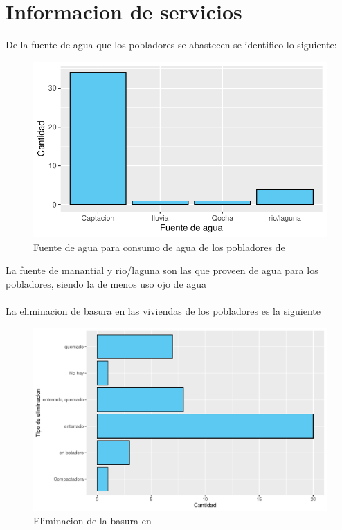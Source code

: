 \documentclass[12pt]{article}\usepackage[]{graphicx}\usepackage[]{xcolor}
\makeatletter
\def\maxwidth{ %
  \ifdim\Gin@nat@width>\linewidth
    \linewidth
  \else
    \Gin@nat@width
  \fi
}
\newenvironment{knitrout}{}{} %
\makeatother
\begin{document}
	\section{Informacion de servicios}
	De la fuente de agua que los pobladores se abastecen se identifico lo siguiente:
	\begin{figure}[H]
	\centering
\begin{knitrout}
\color{fgcolor}
\includegraphics[width=\maxwidth]{figure/seis-1} 
\end{knitrout}
	\caption{Fuente de agua para consumo de agua de los pobladores de \comunidad}
	\end{figure}
	La fuente de manantial y rio/laguna son las que proveen de agua para los pobladores, siendo la de menos uso ojo de agua\\
	\\
	La eliminacion de basura en las viviendas de los pobladores es la siguiente
	\begin{figure}[H]
	\centering
\begin{knitrout}
\color{fgcolor}
\includegraphics[width=\maxwidth]{figure/siete-1} 
\end{knitrout}
	\caption{Eliminacion de la basura en \comunidad}
	\end{figure}
\end{document}
